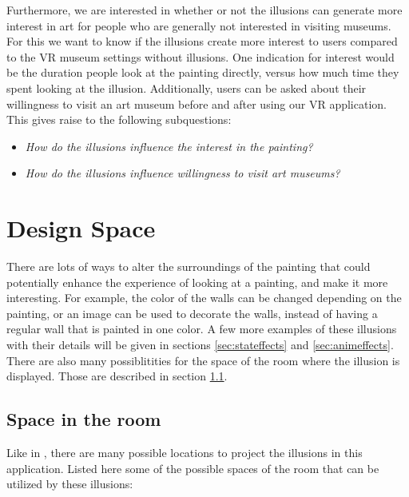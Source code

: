 \documentclass[a4paper]{article}
\begin{document}
Furthermore, we are interested in whether or not the illusions can generate more interest in art for people who are generally not interested in visiting museums. For this we want to know if the illusions create more interest to users compared to the VR museum settings without illusions. One indication for interest would be the duration people look at the painting directly, versus how much time they spent looking at the illusion. Additionally, users can be asked about their willingness to visit an art museum before and after using our VR application. This gives raise to the following subquestions:

\begin{itemize}
\item{\emph{How do the illusions influence the interest in the painting?}}
\item{\emph{How do the illusions influence willingness to visit art museums?}}
\end{itemize}

\section{Design Space}\label{design space}

There are lots of ways to alter the surroundings of the painting that could potentially enhance the experience of looking at a painting, and make it more interesting. For example, the color of the walls can be changed depending on the painting, or an image can be used to decorate the walls, instead of having a regular wall that is painted in one color. A few more examples of these illusions with their details will be given in sections \ref{sec:stateffects} and \ref{sec:animeffects}. There are also many possiblitities for the space of the room where the illusion is displayed. Those are described in section \ref{sec:spaceinroom}. 

\subsection{Space in the room}\label{sec:spaceinroom}
Like in \cite{illumiroom}, there are many possible locations to project the illusions in this application. Listed here some of the possible spaces of the room that can be utilized by these illusions:
\end{document}
